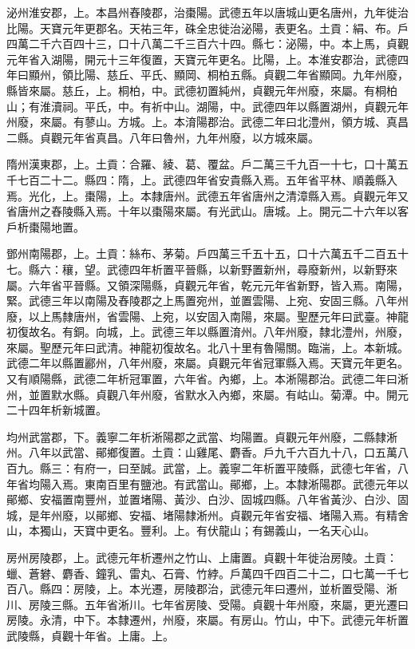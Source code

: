 \begin{pinyinscope}
 泌州淮安郡，上。本昌州舂陵郡，治棗陽。武德五年以唐城山更名唐州，九年徙治比陽。天寶元年更郡名。天祐三年，硃全忠徙治泌陽，表更名。土貢：絹、布。戶四萬二千六百四十三，口十八萬二千三百六十四。縣七：泌陽，中。本上馬，貞觀元年省入湖陽，開元十三年復置，天寶元年更名。比陽，上。本淮安郡治，武德四年曰顯州，領比陽、慈丘、平氏、顯岡、桐柏五縣。貞觀二年省顯岡。九年州廢，縣皆來屬。慈丘，上。桐柏，中。武德初置純州，貞觀元年州廢，來屬。有桐柏山；有淮瀆祠。平氏，中。有祈中山。湖陽，中。武德四年以縣置湖州，貞觀元年州廢，來屬。有蓼山。方城。上。本淯陽郡治。武德二年曰北澧州，領方城、真昌二縣。貞觀元年省真昌。八年曰魯州，九年州廢，以方城來屬。



 隋州漢東郡，上。土貢：合羅、綾、葛、覆盆。戶二萬三千九百一十七，口十萬五千七百二十二。縣四：隋，上。武德四年省安貴縣入焉。五年省平林、順義縣入焉。光化，上。棗陽，上。本隸唐州。武德五年省唐州之清漳縣入焉。貞觀元年又省唐州之舂陵縣入焉。十年以棗陽來屬。有光武山。唐城。上。開元二十六年以客戶析棗陽地置。



 鄧州南陽郡，上。土貢：絲布、茅菊。戶四萬三千五十五，口十六萬五千二百五十七。縣六：穰，望。武德四年析置平晉縣，以新野置新州，尋廢新州，以新野來屬。六年省平晉縣。又領深陽縣，貞觀元年省，乾元元年省新野，皆入焉。南陽，緊。武德三年以南陽及舂陵郡之上馬置宛州，並置雲陽、上宛、安固三縣。八年州廢，以上馬隸唐州，省雲陽、上宛，以安固入南陽，來屬。聖歷元年曰武臺。神龍初復故名。有銅。向城，上。武德三年以縣置淯州。八年州廢，隸北澧州，州廢，來屬。聖歷元年曰武清。神龍初復故名。北八十里有魯陽關。臨湍，上。本新城。武德二年以縣置酈州，八年州廢，來屬。貞觀元年省冠軍縣入焉。天寶元年更名。又有順陽縣，武德二年析冠軍置，六年省。內鄉，上。本淅陽郡治。武德二年曰淅州，並置默水縣。貞觀八年州廢，省默水入內鄉，來屬。有岵山。菊潭。中。開元二十四年析新城置。



 均州武當郡，下。義寧二年析淅陽郡之武當、均陽置。貞觀元年州廢，二縣隸淅州。八年以武當、鄖鄉復置。土貢：山雞尾、麝香。戶九千六百九十八，口五萬八百九。縣三：有府一，曰至誠。武當，上。義寧二年析置平陵縣，武德七年省，八年省均陽入焉。東南百里有鹽池。有武當山。鄖鄉，上。本隸淅陽郡。武德元年以鄖鄉、安福置南豐州，並置堵陽、黃沙、白沙、固城四縣。八年省黃沙、白沙、固城，是年州廢，以鄖鄉、安福、堵陽隸淅州。貞觀元年省安福、堵陽入焉。有精舍山，本獨山，天寶中更名。豐利。上。有伏龍山；有錫義山，一名天心山。



 房州房陵郡，上。武德元年析遷州之竹山、上庸置。貞觀十年徙治房陵。土貢：蠟、蒼礬、麝香、鐘乳、雷丸、石膏、竹綍。戶萬四千四百二十二，口七萬一千七百八。縣四：房陵，上。本光遷，房陵郡治，武德元年曰遷州，並析置受陽、淅川、房陵三縣。五年省淅川。七年省房陵、受陽。貞觀十年州廢，來屬，更光遷曰房陵。永清，中下。本隸遷州，州廢，來屬。有房山。竹山，中下。武德元年析置武陵縣，貞觀十年省。上庸。上。




\end{pinyinscope}
